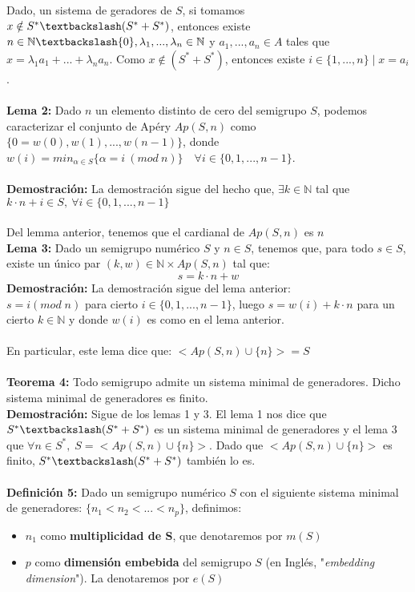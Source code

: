 \documentclass[10pt,spanish]{book}
\begin{document}
Dado, un sistema de geradores de $S$, si tomamos $x\notin S^{*}\textbackslash (S^{*}+S^{*})$, entonces existe $n\in \mathbb{N}\textbackslash\{0\}, \lambda_{1},...,\lambda_{n}\in\mathbb{N}$ y $a_{1},...,a_{n}\in A$ tales que $x=\lambda_{1}a_{1}+...+\lambda_{n}a_{n}$. Como $x\notin (S^{*}+S^{*})$, entonces existe $i\in\{1,...,n\}\; |\; x=a_{i}$.\\
\\ \textbf{Lema 2: } Dado $n$ un elemento distinto de cero del semigrupo $S$, podemos caracterizar el conjunto de Apéry $Ap(S,n)$ como $\{0=w(0), w(1),...,w(n-1)\}$, donde $w(i) = min_{\alpha\in S}\{\alpha = i\:(mod\: n)\}\quad \forall i\in\{0,1,...,n-1\}$. \\
\\ \textbf{Demostración:} La demostración sigue del hecho que,  $\exists k\in \mathbb{N}$ tal que $k\cdot n + i \in S,\: \forall i\in \{0,1,...,n-1\}$ \\
\\Del lemma anterior, tenemos que el cardianal de $Ap(S, n)$ es $n$\\
\textbf{Lema 3:} Dado un semigrupo numérico $S$ y $n\in S$, tenemos que, para todo $s\in S$, existe un único par $(k,w)\in \mathbb{N}\times Ap(S,n)$ tal que:
$$s=k\cdot n + w$$ 
\textbf{Demostración:} La demostración sigue del lema anterior:\\ $s = i (mod\; n)$ para cierto $i\in \{0,1,...,n-1\}$, luego $s=w(i)+k\cdot n$ para un cierto $k\in \mathbb{N}$ y donde $w(i)$ es como en el lema anterior. \\
\\ En particular, este lema dice que: $<Ap(S,n)\cup\{n\}>=S$\\
\\ \textbf{Teorema 4: } Todo semigrupo admite un sistema minimal de generadores. Dicho sistema minimal de generadores es finito. \\
\textbf{Demostración: } Sigue de los lemas 1 y 3. El lema 1 nos dice que $S^{*}\textbackslash (S^{*}+S^{*})$ es un sistema minimal de generadores y el lema 3 que  $\forall n\in S^{*},\; S=<Ap(S,n)\cup\{n\}>$. Dado que  $<Ap(S,n)\cup\{n\}>$ es finito, $S^{*}\textbackslash (S^{*}+S^{*})$ también lo es. \\
\\ \textbf{Definición 5:} Dado un semigrupo numérico $S$ con el siguiente sistema minimal de generadores: $\{n_{1}<n_{2}<...<n_{p}\}$, definimos:
\begin{itemize}
	\item $n_{1}$ como \textbf{multiplicidad de S}, que denotaremos por $m(S)$
	\item $p$ como \textbf{dimensión embebida} del semigrupo $S$ (en Inglés, "\textit{embedding dimension}"). La denotaremos por $e(S)$
\end{itemize}
\end{document}
